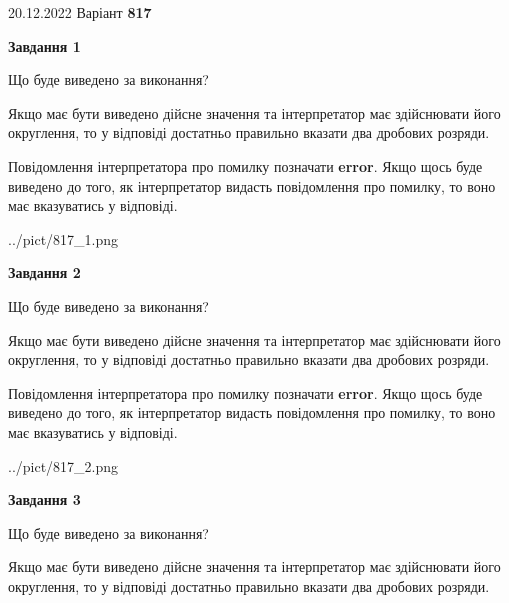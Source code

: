 \documentclass[12pt, ukrainian]{article}
\begin{document}
{20.12.2022 Варіант \No \textbf { 817 }\par}
{
\begin {Large}

{\begin {center}\textbf{Завдання 1}\end {center}}\par
Що буде виведено за виконання? \par

Якщо має бути виведено дійсне значення та інтерпретатор має здійснювати його округлення, 
то у відповіді достатньо правильно вказати два дробових розряди.

Повідомлення інтерпретатора про помилку позначати \textbf{error}.
Якщо щось буде виведено до того, як інтерпретатор видасть повідомлення про помилку, 
то воно має вказуватись у відповіді. \par

\begin{center}
	{../pict/817_1.png}
\end{center}
\newpage

{\begin {center}\textbf{Завдання 2}\end {center}}\par
Що буде виведено за виконання? \par

Якщо має бути виведено дійсне значення та інтерпретатор має здійснювати його округлення, 
то у відповіді достатньо правильно вказати два дробових розряди.

Повідомлення інтерпретатора про помилку позначати \textbf{error}.
Якщо щось буде виведено до того, як інтерпретатор видасть повідомлення про помилку, 
то воно має вказуватись у відповіді. \par

\begin{center}
	{../pict/817_2.png}
\end{center}
\newpage

{\begin {center}\textbf{Завдання 3}\end {center}}\par
Що буде виведено за виконання? \par

Якщо має бути виведено дійсне значення та інтерпретатор має здійснювати його округлення, 
то у відповіді достатньо правильно вказати два дробових розряди.


\end{Large}}
\end{document}
